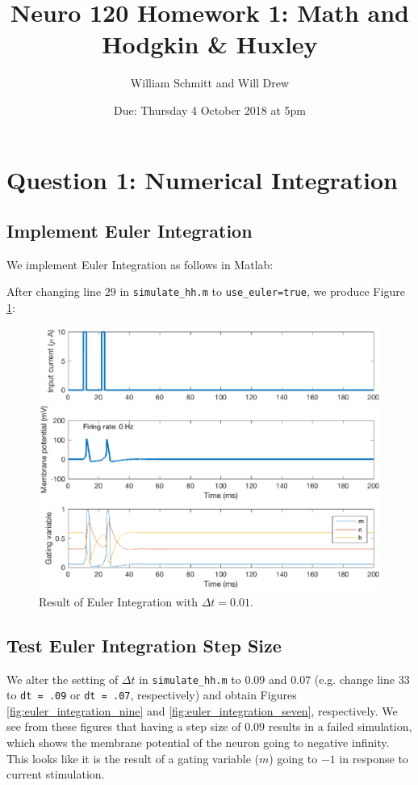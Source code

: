 \documentclass[11pt, oneside]{article}
\title{Neuro 120 Homework 1: Math and Hodgkin \& Huxley}
\author{William Schmitt and Will Drew}
\date{Due: Thursday 4 October 2018 at 5pm}
\begin{document}
\maketitle

\section{Question 1: Numerical Integration}

\subsection{Implement Euler Integration}
We implement Euler Integration as follows in Matlab:


After changing line $29$ in \lstinline{simulate_hh.m} to \lstinline{use_euler=true}, we produce Figure \ref{fig:euler_integration_one}:

\begin{figure}[ht!]
\centering
\includegraphics[width=1\textwidth]{simulate_hh_dt_1.eps}
\caption{Result of Euler Integration with $\Delta t = 0.01$.}
\label{fig:euler_integration_one}
\end{figure}

\subsection{Test Euler Integration Step Size}
We alter the setting of $\Delta t$ in \lstinline{simulate_hh.m} to $0.09$ and $0.07$ (e.g. change line 33 to \lstinline{dt = .09} or \lstinline{dt = .07}, respectively) and obtain Figures \ref{fig:euler_integration_nine} and \ref{fig:euler_integration_seven}, respectively. We see from these figures that having a step size of $0.09$ results in a failed simulation, which shows the membrane potential of the neuron going to negative infinity. This looks like it is the result of a gating variable ($m$) going to $-1$ in response to current stimulation.
\end{document}
